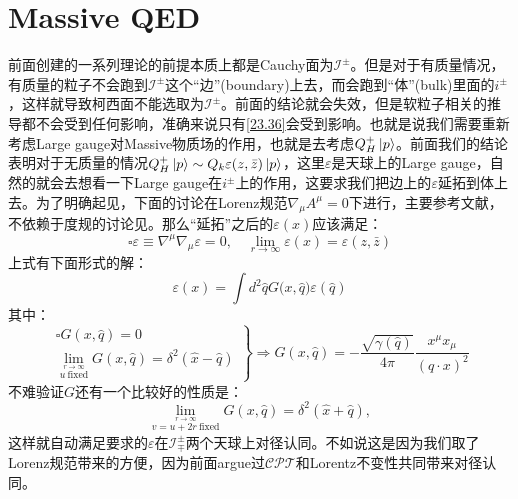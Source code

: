 \section{Massive QED}\label{sec:27}
前面创建的一系列理论的前提本质上都是Cauchy面为$\mathcal{I}^\pm$。但是对于有质量情况，有质量的粒子不会跑到$\mathcal{I}^\pm$这个“边”(boundary)上去，而会跑到“体”(bulk)里面的$i^{\pm}$，这样就导致柯西面不能选取为$\mathcal{I}^\pm$。前面的结论就会失效，但是软粒子相关的推导都不会受到任何影响，准确来说只有\ref{23.36}会受到影响。也就是说我们需要重新考虑Large gauge对Massive物质场的作用，也就是去考虑$Q^{+}_H\ket{p}$。前面我们的结论表明对于无质量的情况$Q^{+}_H\ket{p}\sim Q_k\varepsilon(z,\bar z)\ket{p}$，这里$\varepsilon$是天球上的Large gauge，自然的就会去想看一下Large gauge在$i^\pm$上的作用，这要求我们把边上的$\varepsilon$延拓到体上去。为了明确起见，下面的讨论在Lorenz规范$\nabla_\mu A^\mu=0$下进行，主要参考文献\cite{Campiglia:2015qka}，不依赖于度规的讨论见\cite{Kapec:2015ena}。那么“延拓”之后的$\varepsilon(x)$应该满足：
\begin{equation}
	\square\varepsilon\equiv\nabla^\mu\nabla_\mu\varepsilon=0,\quad \lim_{r\to\infty}\varepsilon(x)=\varepsilon(z,\bar z)
\end{equation}
上式有下面形式的解：
\begin{equation}
	\varepsilon(x)=\int d^2\hat{q}G\big(x,\hat{q}\big)\varepsilon(\hat{q})
\end{equation}
其中：
\begin{equation}
	\left.
	\begin{matrix}
		\square G(x,\hat{q})=0\\
		\lim_{\overset{r\to\infty}{u\ \text{fixed}}}G(x,\hat{q})=\delta^2(\hat{x}-\hat{q})
	\end{matrix}
	\right\}\Rightarrow G\left(x,\hat{q}\right)=-\frac{\sqrt{\gamma(\hat{q})}}{4\pi}\frac{x^{\mu}x_{\mu}}{(q\cdot x)^2}
\end{equation}
不难验证$G$还有一个比较好的性质是：
\[\lim_{\overset{r\to\infty}{v=u+2r\ \text{fixed}}}G(x,\hat{q})=\delta^2(\hat{x}+\hat{q}),\]
这样就自动满足要求的$\varepsilon$在$\mathcal{I}^\pm_\mp$两个天球上对径认同。不如说这是因为我们取了Lorenz规范带来的方便，因为前面argue过$\mathcal{CPT}$和Lorentz不变性共同带来对径认同。

